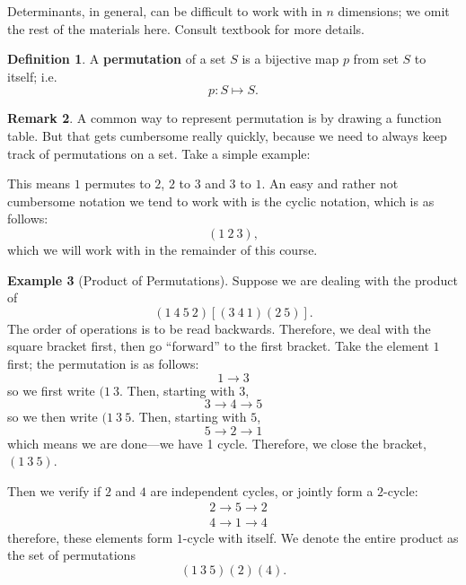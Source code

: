 \documentclass[11pt]{amsart} %
\theoremstyle{definition}
\newtheorem{definition}{Definition}[section]
\newtheorem{example}[definition]{Example}
\theoremstyle{definition}
\newtheorem{remark}[definition]{Remark}
\numberwithin{equation}{section}
\begin{document}
Determinants, in general, can be difficult to work with in $n$ dimensions; we omit the rest of the materials here. Consult textbook for more details.

\begin{definition}
	A \textbf{permutation} of a set $S$ is a bijective map $p$ from set $S$ to itself; i.e.
	$$ p: S \mapsto S.$$
\end{definition}

\begin{remark}
	A common way to represent permutation is by drawing a function table. But that gets cumbersome really quickly, because we need to always keep track of permutations on a set. Take a simple example:

	\begin{figure}[H]
		\centering
	\end{figure}

	This means $1$ permutes to $2$, $2$ to $3$ and $3$ to $1$. An easy and rather not cumbersome notation we tend to work with is the cyclic notation, which is as follows:
	$$( 1 \: 2 \: 3  ),$$
	which we will work with in the remainder of this course.
\end{remark}

\begin{example}[Product of Permutations]
	Suppose we are dealing with the product of
	$$( 1 \: 4 \: 5 \: 2  ) [ ( 3 \: 4 \: 1  ) ( 2 \: 5 )  ]  . $$
	The order of operations is to be read backwards. Therefore, we deal with the square bracket first, then go ``forward'' to the first bracket. Take the element $1$ first; the permutation is as follows:	
	$$ 1 \to 3 $$
	so we first write $(1 \: 3 $. Then, starting with $3$,
	$$3 \to 4 \to 5 $$
	so we then write $(1 \: 3 \: 5$. Then, starting with $5$,
	$$ 5 \to 2 \to 1$$
	which means we are done---we have 1 cycle. Therefore, we close the bracket, $(1 \: 3 \: 5)$.
	
	Then we verify if $2$ and $4$ are independent cycles, or jointly form a $2$-cycle:
	$$\begin{aligned}
	&2 \to 5 \to 2 \\
	& 4 \to 1 \to 4 
	\end{aligned}$$
	therefore, these elements form $1$-cycle with itself. We denote the entire product as the set of permutations
	$$ (1 \: 3 \: 5)(2)(4).  $$
\end{example}
\end{document}
